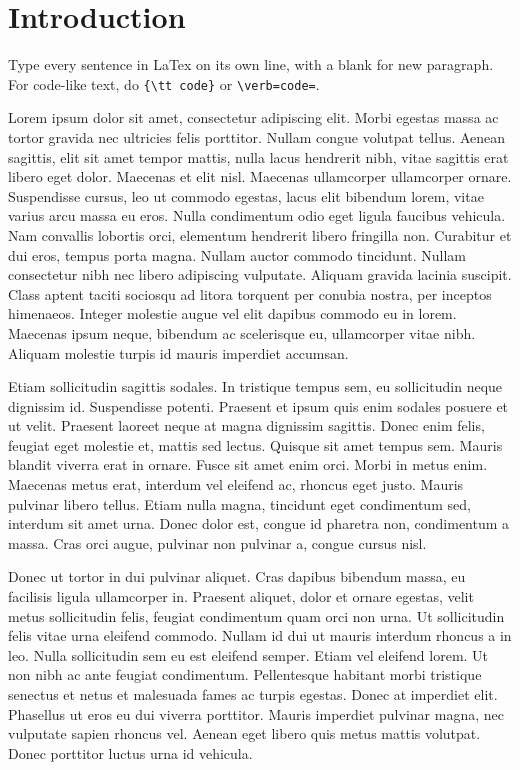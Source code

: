 \section{Introduction}

Type every sentence in LaTex on its own line, with a blank for new paragraph.
For code-like text, do \verb={\tt code}= or \verb+\verb=code=+.

Lorem ipsum dolor sit amet, consectetur adipiscing elit. 
Morbi egestas massa ac tortor gravida nec ultricies felis porttitor. 
Nullam congue volutpat tellus. 
Aenean sagittis, elit sit amet tempor mattis, nulla lacus hendrerit nibh, vitae sagittis erat libero eget dolor.
Maecenas et elit nisl. 
Maecenas ullamcorper ullamcorper ornare. 
Suspendisse cursus, leo ut commodo egestas, lacus elit bibendum lorem, vitae varius arcu massa eu eros. 
Nulla condimentum odio eget ligula faucibus vehicula. 
Nam convallis lobortis orci, elementum hendrerit libero fringilla non. 
Curabitur et dui eros, tempus porta magna. 
Nullam auctor commodo tincidunt. Nullam consectetur nibh nec libero adipiscing vulputate. 
Aliquam gravida lacinia suscipit. 
Class aptent taciti sociosqu ad litora torquent per conubia nostra, per inceptos himenaeos. 
Integer molestie augue vel elit dapibus commodo eu in lorem. Maecenas ipsum neque, bibendum ac scelerisque eu, ullamcorper vitae nibh. 
Aliquam molestie turpis id mauris imperdiet accumsan.

Etiam sollicitudin sagittis sodales. In tristique tempus sem, eu sollicitudin neque dignissim id. Suspendisse potenti. Praesent et ipsum quis enim sodales posuere et ut velit. Praesent laoreet neque at magna dignissim sagittis. Donec enim felis, feugiat eget molestie et, mattis sed lectus. Quisque sit amet tempus sem. Mauris blandit viverra erat in ornare. Fusce sit amet enim orci. Morbi in metus enim. Maecenas metus erat, interdum vel eleifend ac, rhoncus eget justo. Mauris pulvinar libero tellus. Etiam nulla magna, tincidunt eget condimentum sed, interdum sit amet urna. Donec dolor est, congue id pharetra non, condimentum a massa. Cras orci augue, pulvinar non pulvinar a, congue cursus nisl.

Donec ut tortor in dui pulvinar aliquet. Cras dapibus bibendum massa, eu facilisis ligula ullamcorper in. Praesent aliquet, dolor et ornare egestas, velit metus sollicitudin felis, feugiat condimentum quam orci non urna. Ut sollicitudin felis vitae urna eleifend commodo. Nullam id dui ut mauris interdum rhoncus a in leo. Nulla sollicitudin sem eu est eleifend semper. Etiam vel eleifend lorem. Ut non nibh ac ante feugiat condimentum. Pellentesque habitant morbi tristique senectus et netus et malesuada fames ac turpis egestas. Donec at imperdiet elit. Phasellus ut eros eu dui viverra porttitor. Mauris imperdiet pulvinar magna, nec vulputate sapien rhoncus vel. Aenean eget libero quis metus mattis volutpat. Donec porttitor luctus urna id vehicula. 
